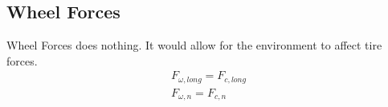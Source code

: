 \documentclass[../SimBALink.tex]{subfiles}
\begin{document}
\subsection{Wheel Forces}
Wheel Forces does nothing. It would allow for the environment to affect tire forces.
\begin{gather}
F_{\omega,long} = F_{c,long} \\
F_{\omega,n} = F_{c,n}
\end{gather}
\end{document}

